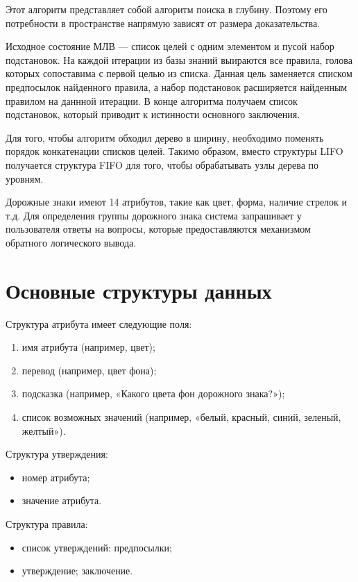 Этот алгоритм представляет собой алгоритм поиска в глубину. Поэтому его потребности в пространстве напрямую зависят от размера доказательства.

Исходное состояние МЛВ --- список целей с одним элементом и пусой набор подстановок. На каждой итерации из базы знаний выираются все правила, голова которых сопоставима с первой целью из списка. Данная цель заменяется списком предпосылок найденного правила, а набор подстановок расширяется найденным правилом на даннной итерации. В конце алгоритма получаем список подстановок, который приводит к истинности основного заключения.

Для того, чтобы алгоритм обходил дерево в ширину, необходимо поменять порядок конкатенации списков целей. Такимо образом, вместо структуры LIFO получается структура FIFO для того, чтобы обрабатывать узлы дерева по уровням.

Дорожные знаки имеют 14 атрибутов, такие как цвет, форма, наличие стрелок и т.д. Для определения группы дорожного знака система запрашивает у пользователя ответы на вопросы, которые предоставляются механизмом обратного логического вывода.

\section{Основные структуры данных}

Структура атрибута имеет следующие поля:
\begin{enumerate}
    \item имя атрибута (например, цвет);
    \item перевод (например, цвет фона);
    \item подсказка (например, «Какого цвета фон дорожного знака?»);
    \item список возможных значений (например, «белый, красный, синий, зеленый, желтый»).
\end{enumerate}

Структура утверждения:
\begin{itemize}
    \item номер атрибута;
    \item значение атрибута.
\end{itemize}

Структура правила:
\begin{itemize}
    \item список утверждений: предпосылки;
    \item утверждение; заключение.
\end{itemize}

